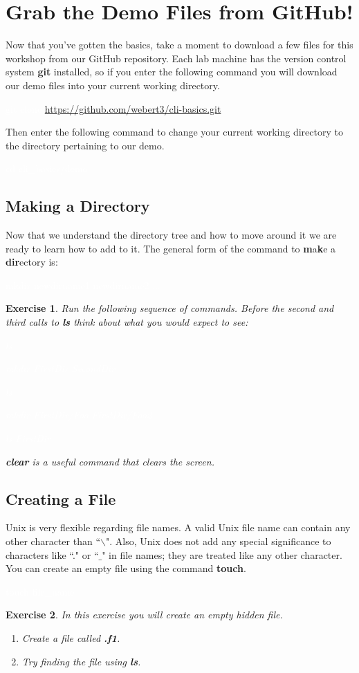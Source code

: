 \documentclass[oneside]{book}
\newcommand{\commandline}[1]{\begin{center} \colorbox{Dark}{\textcolor{white}{#1}} \end{center}}
\newtheorem{ex}{Exercise}[chapter]
\begin{document}
\section{Grab the Demo Files from GitHub!}
Now that you've gotten the basics, take a moment to download a few files for this workshop from our GitHub repository. Each lab machine has the version control system \textbf{git} installed, so if you enter the following command you will download our demo files into your current working directory.

\commandline{git clone \url{https://github.com/webert3/cli-basics.git}}
Then enter the following command to change your current working directory to the directory pertaining to our demo.
\commandline{cd cli\_basics/demo}

\subsection{Making a Directory}
Now that we understand the directory tree and how to move around it we are ready to learn how to add to it. The general form of the command to \textbf{m}a\textbf{k}e a \textbf{dir}ectory is:
\commandline{mkdir newdirname1 newdirname2 ...}
\begin{ex}
	Run the following sequence of commands. Before the second and third calls to \textbf{ls} think about what you would expect to see:
\commandline{ls}
\commandline{mkdir FirstDir SecondDir}
\commandline{ls}
\commandline{mkdir FirstDir/Foo FirstDir/Foo2}
\commandline{ls FirstDir}
\textbf{clear} is a useful command that clears the screen.
\end{ex}

\subsection{Creating a File}

Unix is very flexible regarding file names. A valid Unix file name can contain any other character than ``$\backslash$". Also, Unix does not add any special significance to characters like ``." or ``$\_$" in file names; they are treated like any other character. You can create an empty file using the command \textbf{touch}.
\commandline{touch file_name}

\begin{ex} In this exercise you will create an empty hidden file.
    \begin{enumerate}
        \item Create a file called \textbf{.f1}.
        \item Try finding the file using \textbf{ls}.
    \end{enumerate}        
\end{ex}
\end{document}
